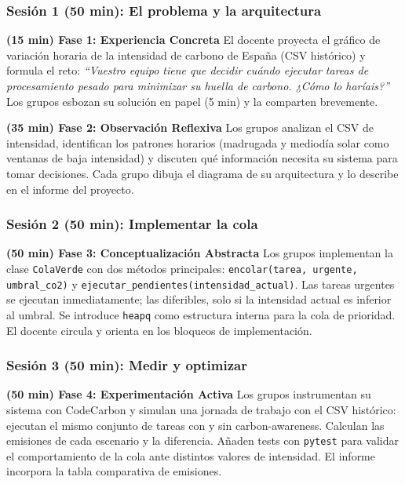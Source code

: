 \subsubsection{Sesión 1 (50 min): El problema y la arquitectura}


\textbf{(15 min) Fase 1: Experiencia Concreta} El docente proyecta el gráfico de variación horaria de la intensidad de carbono de España (CSV histórico) y formula el reto: \textit{``Vuestro equipo tiene que decidir cuándo ejecutar tareas de procesamiento pesado para minimizar su huella de carbono. ¿Cómo lo haríais?''} Los grupos esbozan su solución en papel (5 min) y la comparten brevemente.


\textbf{(35 min) Fase 2: Observación Reflexiva} Los grupos analizan el CSV de intensidad, identifican los patrones horarios (madrugada y mediodía solar como ventanas de baja intensidad) y discuten qué información necesita su sistema para tomar decisiones. Cada grupo dibuja el diagrama de su arquitectura y lo describe en el informe del proyecto.




\subsubsection{Sesión 2 (50 min): Implementar la cola}


\textbf{(50 min) Fase 3: Conceptualización Abstracta} Los grupos implementan la clase \texttt{ColaVerde} con dos métodos principales: \texttt{encolar(tarea, urgente, umbral\_co2)} y \texttt{ejecutar\_pendientes(intensidad\_actual)}. Las tareas urgentes se ejecutan inmediatamente; las diferibles, solo si la intensidad actual es inferior al umbral. Se introduce \texttt{heapq} como estructura interna para la cola de prioridad. El docente circula y orienta en los bloqueos de implementación.




\subsubsection{Sesión 3 (50 min): Medir y optimizar}


\textbf{(50 min) Fase 4: Experimentación Activa} Los grupos instrumentan su sistema con CodeCarbon y simulan una jornada de trabajo con el CSV histórico: ejecutan el mismo conjunto de tareas con y sin carbon-awareness. Calculan las emisiones de cada escenario y la diferencia. Añaden tests con \texttt{pytest} para validar el comportamiento de la cola ante distintos valores de intensidad. El informe incorpora la tabla comparativa de emisiones.




